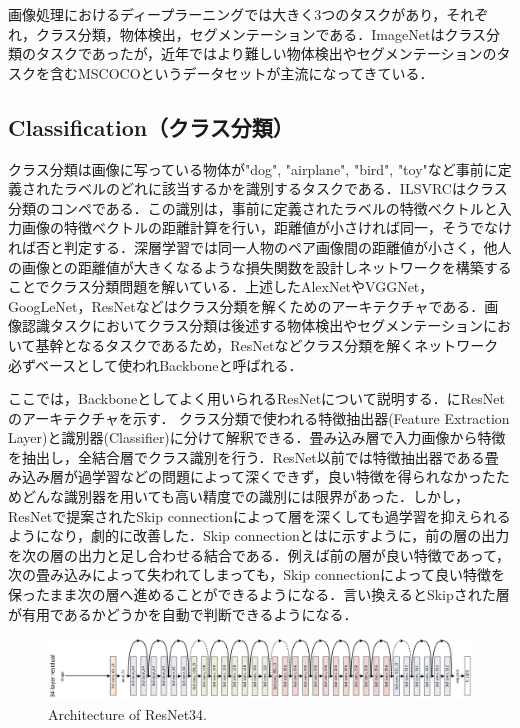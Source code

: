 画像処理におけるディープラーニングでは大きく3つのタスクがあり，それぞれ，クラス分類，物体検出，セグメンテーションである．ImageNetはクラス分類のタスクであったが，近年ではより難しい物体検出やセグメンテーションのタスクを含むMSCOCOというデータセットが主流になってきている．


\subsection{Classification（クラス分類）}
クラス分類は画像に写っている物体が"dog", "airplane", "bird", "toy"など事前に定義されたラベルのどれに該当するかを識別するタスクである．ILSVRCはクラス分類のコンペである．この識別は，事前に定義されたラベルの特徴べクトルと入力画像の特徴べクトルの距離計算を行い，距離値が小さければ同一，そうでなければ否と判定する．深層学習では同一人物のペア画像間の距離値が小さく，他人の画像との距離値が大きくなるような損失関数を設計しネットワークを構築することでクラス分類問題を解いている．上述したAlexNetやVGGNet，GoogLeNet，ResNetなどはクラス分類を解くためのアーキテクチャである．画像認識タスクにおいてクラス分類は後述する物体検出やセグメンテーションにおいて基幹となるタスクであるため，ResNetなどクラス分類を解くネットワーク必ずベースとして使われBackboneと呼ばれる．

ここでは，Backboneとしてよく用いられるResNetについて説明する．にResNetのアーキテクチャを示す．
クラス分類で使われる特徴抽出器(Feature Extraction Layer)と識別器(Classifier)に分けて解釈できる．畳み込み層で入力画像から特徴を抽出し，全結合層でクラス識別を行う．ResNet以前では特徴抽出器である畳み込み層が過学習などの問題によって深くできず，良い特徴を得られなかったためどんな識別器を用いても高い精度での識別には限界があった．しかし，ResNetで提案されたSkip connectionによって層を深くしても過学習を抑えられるようになり，劇的に改善した．Skip connectionとはに示すように，前の層の出力を次の層の出力と足し合わせる結合である．例えば前の層が良い特徴であって，次の畳み込みによって失われてしまっても，Skip connectionによって良い特徴を保ったまま次の層へ進めることができるようになる．言い換えるとSkipされた層が有用であるかどうかを自動で判断できるようになる．

\begin{figure}
    \centering
    \includegraphics[width=\linewidth]{figure/chapter2/resnet34}
    \caption{Architecture of ResNet34.}
    \label{fig:ResNet}
\end{figure}

